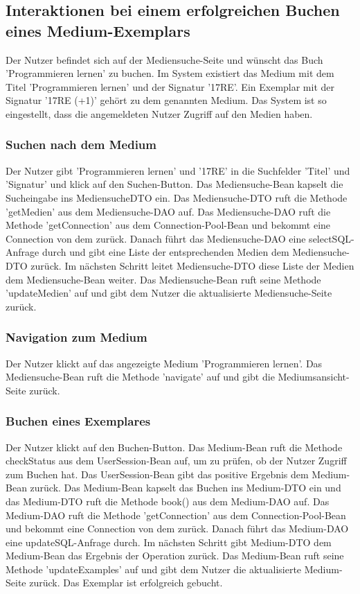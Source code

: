 \documentclass{article}
\begin{document}
\subsection{Interaktionen bei einem erfolgreichen Buchen eines Medium-Exemplars}
Der Nutzer befindet sich auf der Mediensuche-Seite und wünscht das Buch 'Programmieren lernen' zu buchen. Im System existiert das Medium mit dem Titel 'Programmieren lernen' und der Signatur '17RE'. Ein Exemplar mit der Signatur '17RE (+1)' gehört zu dem genannten Medium. Das System ist so eingestellt, dass die angemeldeten Nutzer Zugriff auf den Medien haben.
\subsubsection{Suchen nach dem Medium}
Der Nutzer gibt 'Programmieren lernen' und '17RE' in die Suchfelder 'Titel' und 'Signatur' und klick auf den Suchen-Button. Das Mediensuche-Bean kapselt die Sucheingabe ins MediensucheDTO ein. Das Mediensuche-DTO ruft die Methode 'getMedien' aus dem Mediensuche-DAO auf. Das Mediensuche-DAO ruft die Methode 'getConnection' aus dem Connection-Pool-Bean und bekommt eine Connection von dem zurück. Danach führt das Mediensuche-DAO eine selectSQL-Anfrage durch und gibt eine Liste der entsprechenden Medien dem Mediensuche-DTO zurück. Im nächsten Schritt leitet Mediensuche-DTO diese Liste der Medien dem Mediensuche-Bean weiter. Das Mediensuche-Bean ruft seine Methode 'updateMedien' auf und gibt dem Nutzer die aktualisierte Mediensuche-Seite zurück.
\subsubsection{Navigation zum Medium}
Der Nutzer klickt auf das angezeigte Medium 'Programmieren lernen'. Das Mediensuche-Bean ruft die Methode 'navigate' auf und gibt die Mediumsansicht-Seite zurück.
\subsubsection{Buchen eines Exemplares}
Der Nutzer klickt auf den Buchen-Button. Das Medium-Bean ruft die Methode checkStatus aus dem UserSession-Bean auf, um zu prüfen, ob der Nutzer Zugriff zum Buchen hat. Das UserSession-Bean gibt das positive Ergebnis dem Medium-Bean zurück. Das Medium-Bean kapselt das Buchen ins Medium-DTO ein und das Medium-DTO ruft die Methode book() aus dem Medium-DAO auf. Das Medium-DAO ruft die Methode 'getConnection' aus dem Connection-Pool-Bean und bekommt eine Connection von dem zurück. Danach führt das Medium-DAO eine updateSQL-Anfrage durch. Im nächsten Schritt gibt Medium-DTO  dem Medium-Bean das Ergebnis der Operation zurück. Das Medium-Bean ruft seine Methode 'updateExamples' auf und gibt dem Nutzer die aktualisierte Medium-Seite zurück. Das Exemplar ist erfolgreich gebucht.
\end{document}
